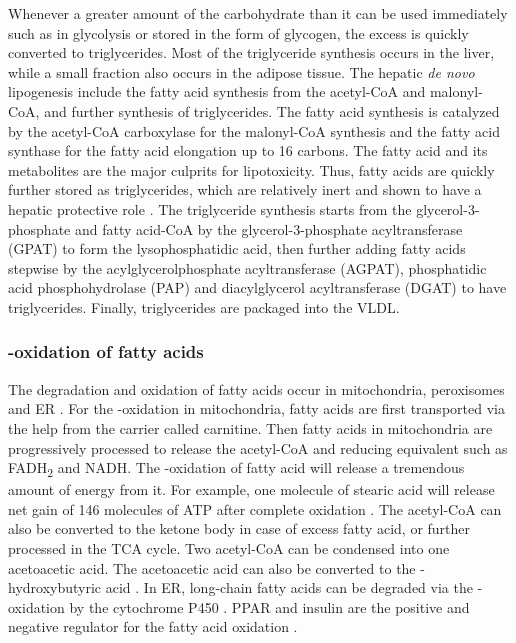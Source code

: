 Whenever a greater amount of the carbohydrate than it can be used immediately such as in glycolysis or stored in the form of glycogen, the excess is quickly converted to triglycerides. Most of the triglyceride synthesis occurs in the liver, while a small fraction also occurs in the adipose tissue. The hepatic \textit{de novo} lipogenesis include the fatty acid synthesis from the acetyl-CoA and malonyl-CoA, and further synthesis of triglycerides. The fatty acid synthesis is catalyzed by the acetyl-CoA carboxylase for the malonyl-CoA synthesis and the fatty acid synthase for the fatty acid elongation up to 16 carbons. The fatty acid and its metabolites are the major culprits for lipotoxicity. Thus, fatty acids are quickly further stored as triglycerides, which are relatively inert and shown to have a hepatic protective role \cite{choi_hepatic_2008}. The triglyceride synthesis starts from the glycerol-3-phosphate and fatty acid-CoA by the glycerol-3-phosphate acyltransferase (GPAT) to form the lysophosphatidic acid, then further adding fatty acids stepwise by the acylglycerolphosphate acyltransferase (AGPAT), phosphatidic acid phosphohydrolase (PAP) and diacylglycerol acyltransferase (DGAT) to have triglycerides. Finally, triglycerides are packaged into the VLDL. 

\subsubsection{\texorpdfstring{\textbeta}{b}-oxidation of fatty acids}

The degradation and oxidation of fatty acids occur in mitochondria, peroxisomes and ER \cite{bechmann_interaction_2012}. For the \textbeta{}-oxidation in mitochondria, fatty acids are first transported via the help from the carrier called carnitine. Then fatty acids in mitochondria are progressively processed to release the acetyl-CoA and reducing equivalent such as FADH\textsubscript{2} and NADH. The \textbeta{}-oxidation of fatty acid will release a tremendous amount of energy from it. For example, one molecule of stearic acid will release net gain of 146 molecules of ATP after complete oxidation \cite{hall_guyton_2010}. The acetyl-CoA can also be converted to the ketone body in case of excess fatty acid, or further processed in the TCA cycle. Two acetyl-CoA can be condensed into one acetoacetic acid. The acetoacetic acid can also be converted to the \textbeta{}-hydroxybutyric acid \cite{nguyen_liver_2008}. In ER, long-chain fatty acids can be degraded via the \textomega{}-oxidation by the cytochrome P450 \cite{reddy_nonalcoholic_2001}. PPAR\textalpha{} and insulin are the positive and negative regulator for the fatty acid oxidation \cite{bechmann_interaction_2012}.

